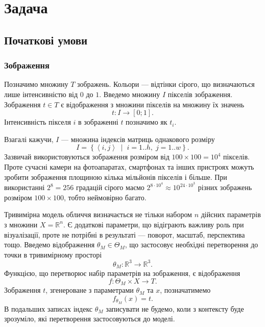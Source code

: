\section{Задача}

\subsection{Початкові умови}

\subsubsection{Зображення}

Позначимо множину $T$ зображень.
Кольори --- відтінки сірого, що визначаються лише інтенсивністю від $0$ до $1$.
Введемо множину $I$ пікселів зображення.
Зображення $t \in T$ є відображення з множини пікселів на множину їх значень
\begin{equation*}
  t: I \rightarrow \left[ 0; 1 \right].
\end{equation*}
Інтенсивність пікселя $i$ в зображенні $t$ позначимо як $t_i$.

Взагалі кажучи, $I$ --- множина індексів матриць однакового розміру
\begin{equation*}
  I = \left\{ \left\langle i, j \right\rangle
    \;\middle|\; i = 1..h,\; j = 1..w \right\}.
\end{equation*}
Зазвичай використовуються зображення розміром від
$100 \times 100 = 10^4$ пікселів.
Проте сучасні камери на фотоапаратах, смартфонах та інших пристроях
можуть зробити зображення площиною кілька мільйонів пікселів і більше.
При використанні $2^8 = 256$ градацій сірого маємо
$2^{8 \cdot 10^4} \approx 10^{24 \cdot 10^3}$
різних зображень розміром $100 \times 100$, тобто неймовірно багато.

Тривимірна модель обличчя визначається не тільки набором $n$ дійсних параметрів
з множини $X = \mathbb{R}^n$.
Є додаткові параметри, що відіграють важливу роль при візуалізації,
проте не потрібні в результаті --- поворот, масштаб, перспектива тощо.
Введемо відображення $\theta_M \in \Theta_M$,
що застосовує необхідні перетворення до точки в тривимірному просторі
\begin{equation*}
  \theta_M: \mathbb{R}^3 \rightarrow \mathbb{R}^3.
\end{equation*}
Функцією, що перетворює набір параметрів на зображення, є відображення
\begin{equation*}
  f: \Theta_M \times X \rightarrow T.
\end{equation*}
Зображення $t$, згенероване з параметрами $\theta_M$ та $x$, позначатимемо
\begin{equation*}
  f_{\theta_M} \left( x \right) = t.
\end{equation*}
В подальших записах індекс $\theta_M$ записувати не будемо,
коли з контексту буде зрозуміло, які перетворення застосовуються до моделі.

